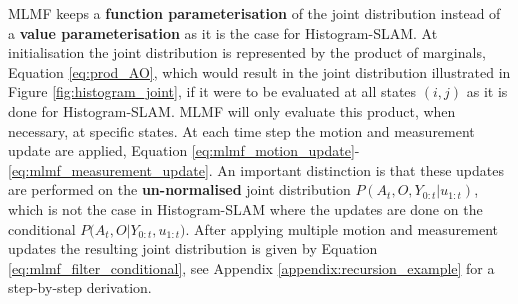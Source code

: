 \documentclass{frontiersSCNS} %
\begin{document}
MLMF keeps a  \textbf{function parameterisation} of the joint distribution instead of a \textbf{value parameterisation} as it is the case 
for Histogram-SLAM. At initialisation the joint distribution is represented by the product of marginals, Equation \ref{eq:prod_AO}, which 
would result in the joint distribution illustrated in Figure \ref{fig:histogram_joint}, if it were to be evaluated at all states $(i,j)$
as it is done for Histogram-SLAM. MLMF will only evaluate this product, when necessary, at specific states. 
At each time step the motion and measurement update are applied, Equation \ref{eq:mlmf_motion_update}-\ref{eq:mlmf_measurement_update}.
An important distinction is that these updates are performed on the \textbf{un-normalised} joint distribution ${P(A_t,O,Y_{0:t}|u_{1:t})}$, which is not the case in Histogram-SLAM where 
the updates are done on the conditional ${P(A_t,O|Y_{0:t},u_{1:t}})$. After applying multiple 
motion and measurement updates the resulting joint distribution is given by Equation \ref{eq:mlmf_filter_conditional}, see Appendix \ref{appendix:recursion_example}
for a step-by-step derivation. 
 
\end{document}
